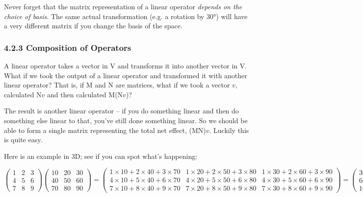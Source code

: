 \documentclass[oneside,english]{amsbook}
\numberwithin{section}{chapter}
\theoremstyle{plain}
\theoremstyle{definition}
\begin{document}
Never forget that the matrix representation of a linear operator
\emph{depends on the choice of basis}. The same actual transformation
(e.g. a rotation by 30°) will have a very different matrix if you change
the basis of the space.

\subsubsection{4.2.3 Composition of
	Operators}\label{composition-of-operators}

A linear operator takes a vector in V and transforms it into another
vector in V. What if we took the output of a linear operator and
transformed it with another linear operator? That is, if M and N are
matrices, what if we took a vector $v$, calculated N$v$ and then
calculated M(N$v$)?

The result is another linear operator -- if you do something linear and
then do something else linear to that, you've still done something
linear. So we should be able to form a single matrix representing the
total net effect, (MN)$v$. Luckily this is quite easy.

Here is an example in 3D; see if you can spot what's happening:

\[\begin{pmatrix}
	1 & 2 & 3 \\
	4 & 5 & 6 \\
	7 & 8 & 9
\end{pmatrix}\begin{pmatrix}
	10 & 20 & 30 \\
	40 & 50 & 60 \\
	70 & 80 & 90
\end{pmatrix} = \begin{pmatrix}
	1 \times 10 + 2 \times 40 + 3 \times 70 & 1 \times 20 + 2 \times 50 + 3 \times 80 & 1 \times 30 + 2 \times 60 + 3 \times 90 \\
	4 \times 10 + 5 \times 40 + 6 \times 70 & 4 \times 20 + 5 \times 50 + 6 \times 80 & 4 \times 30 + 5 \times 60 + 6 \times 90 \\
	7 \times 10 + 8 \times 40 + 9 \times 70 & 7 \times 20 + 8 \times 50 + 9 \times 80 & 7 \times 30 + 8 \times 60 + 9 \times 90
\end{pmatrix} = \begin{pmatrix}
	300 & 360 & 420 \\
	660 & 810 & 960 \\
	1020 & 1260 & 1500
\end{pmatrix}\]
\end{document}
